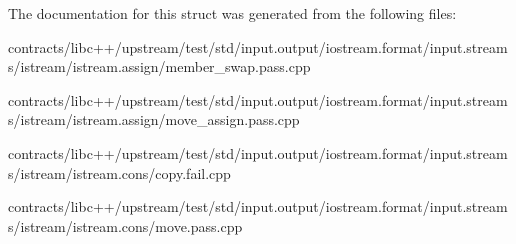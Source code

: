 The documentation for this struct was generated from the following files\+:\begin{DoxyCompactItemize}
\item 
contracts/libc++/upstream/test/std/input.\+output/iostream.\+format/input.\+streams/istream/istream.\+assign/member\+\_\+swap.\+pass.\+cpp\item 
contracts/libc++/upstream/test/std/input.\+output/iostream.\+format/input.\+streams/istream/istream.\+assign/move\+\_\+assign.\+pass.\+cpp\item 
contracts/libc++/upstream/test/std/input.\+output/iostream.\+format/input.\+streams/istream/istream.\+cons/copy.\+fail.\+cpp\item 
contracts/libc++/upstream/test/std/input.\+output/iostream.\+format/input.\+streams/istream/istream.\+cons/move.\+pass.\+cpp\end{DoxyCompactItemize}
